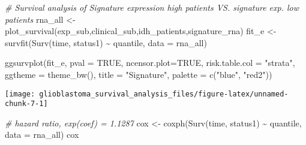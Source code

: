 \documentclass[
]{article}
\newenvironment{Shaded}{\begin{snugshade}}{\end{snugshade}}
\newcommand{\AttributeTok}[1]{\textcolor[rgb]{0.77,0.63,0.00}{#1}}
\newcommand{\CommentTok}[1]{\textcolor[rgb]{0.56,0.35,0.01}{\textit{#1}}}
\newcommand{\ConstantTok}[1]{\textcolor[rgb]{0.00,0.00,0.00}{#1}}
\newcommand{\DecValTok}[1]{\textcolor[rgb]{0.00,0.00,0.81}{#1}}
\newcommand{\FunctionTok}[1]{\textcolor[rgb]{0.00,0.00,0.00}{#1}}
\newcommand{\NormalTok}[1]{#1}
\newcommand{\OtherTok}[1]{\textcolor[rgb]{0.56,0.35,0.01}{#1}}
\newcommand{\SpecialCharTok}[1]{\textcolor[rgb]{0.00,0.00,0.00}{#1}}
\newcommand{\StringTok}[1]{\textcolor[rgb]{0.31,0.60,0.02}{#1}}
\begin{document}
\begin{Shaded}
\end{Shaded}

\begin{Shaded}
\begin{Highlighting}[]
\CommentTok{\# Survival analysis of Signature expression high patients VS. signature exp. low patients}
\NormalTok{rna\_all }\OtherTok{\textless{}{-}} \FunctionTok{plot\_survival}\NormalTok{(exp\_sub,clinical\_sub,idh\_patients,signature\_rna)}
\NormalTok{fit\_e }\OtherTok{\textless{}{-}} \FunctionTok{survfit}\NormalTok{(}\FunctionTok{Surv}\NormalTok{(time, status1) }\SpecialCharTok{\textasciitilde{}}\NormalTok{ quantile, }\AttributeTok{data =}\NormalTok{ rna\_all)}

\FunctionTok{ggsurvplot}\NormalTok{(fit\_e,}
           \AttributeTok{pval =} \ConstantTok{TRUE}\NormalTok{,}
           \AttributeTok{ncensor.plot=}\ConstantTok{TRUE}\NormalTok{,}
           \AttributeTok{risk.table.col =} \StringTok{"strata"}\NormalTok{, }
           \AttributeTok{ggtheme =} \FunctionTok{theme\_bw}\NormalTok{(), }
           \AttributeTok{title =} \StringTok{"Signature"}\NormalTok{,}
           \AttributeTok{palette =} \FunctionTok{c}\NormalTok{(}\StringTok{"blue"}\NormalTok{, }\StringTok{"red2"}\NormalTok{))}
\end{Highlighting}
\end{Shaded}

\begin{center}\texttt{[image: glioblastoma\_survival\_analysis\_files/figure-latex/unnamed-chunk-7-1]} \end{center}

\begin{Shaded}
\begin{Highlighting}[]
\CommentTok{\# hazard ratio, exp(coef) = 1.1287}
\NormalTok{cox }\OtherTok{\textless{}{-}} \FunctionTok{coxph}\NormalTok{(}\FunctionTok{Surv}\NormalTok{(time, status1) }\SpecialCharTok{\textasciitilde{}}\NormalTok{ quantile, }\AttributeTok{data =}\NormalTok{ rna\_all)}
\NormalTok{cox}
\end{Highlighting}
\end{Shaded}
\end{document}
